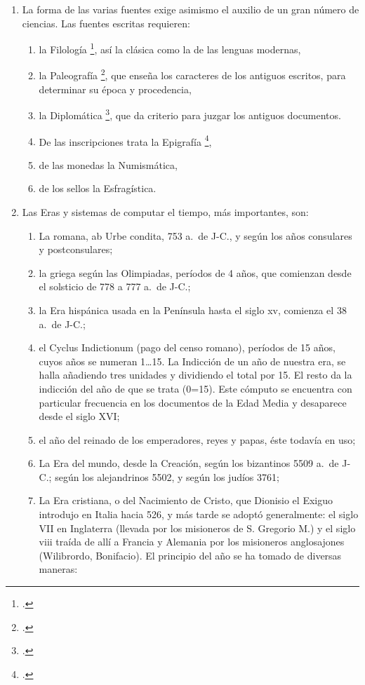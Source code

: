 \raggedbottom{} \documentclass[12pt, a4paper]{book}
\begin{document}
\begin{enumerate}
\begin{enumerate}
        \end{enumerate}
  \item La forma de las varias fuentes exige asimismo el auxilio de un gran número de ciencias. Las fuentes escritas requieren:\@ \begin{enumerate}
          \item la Filología \footcite{Stephanus1831Thesaurus}, así la clásica como la de las lenguas modernas,
          \item la Paleografía \footcite{Silvestre1839Paleographie}, que enseña los caracteres de los antiguos escritos, para determinar su época y procedencia,
          \item la Diplomática \footcite{Mabillon1681DeReDiplomatica}, que da criterio para juzgar los antiguos documentos.
          \item De las inscripciones trata la Epigrafía \footcite{Rossi1890Introductio},
          \item de las monedas la Numismática,
          \item de los sellos la Esfragística.
        \end{enumerate}
  \item Las Eras y sistemas de computar el tiempo, más importantes, son:\@ \begin{enumerate}
          \item La romana, ab Urbe condita, 753 a.\ de J-C., y según los años consulares y postconsulares;
          \item la griega según las Olimpiadas, períodos de 4 años, que comienzan desde el solsticio de 778 a 777 a.\ de J-C.;
          \item la Era hispánica usada en la Península hasta el siglo xv, comienza el 38 a.\ de J-C.;
          \item el Cyclus Indictionum (pago del censo romano), períodos de 15 años, cuyos años se numeran 1\ldots 15. La Indicción de un año de nuestra era, se halla añadiendo tres unidades y dividiendo el total por 15. El resto da la indicción del año de que se trata (0=15). Este cómputo se encuentra con particular frecuencia en los documentos de la Edad Media y desaparece desde el siglo XVI;\@
          \item el año del reinado de los emperadores, reyes y papas, éste todavía en uso;
          \item La Era del mundo, desde la Creación, según los bizantinos 5509 a.\ de J-C.; según los alejandrinos 5502, y según los judíos 3761;
          \item La Era cristiana, o del Nacimiento de Cristo, que Dionisio el Exiguo introdujo en Italia hacia 526, y más tarde se adoptó generalmente: el siglo VII en Inglaterra (llevada por los misioneros de S. Gregorio M.) y el siglo viii traída de allí a Francia y Alemania por los misioneros anglosajones (Wilibrordo, Bonifacio). El principio del año se ha tomado de diversas maneras: \begin{enumerate}

\end{enumerate}
\end{enumerate}
\end{enumerate}
\end{document}
